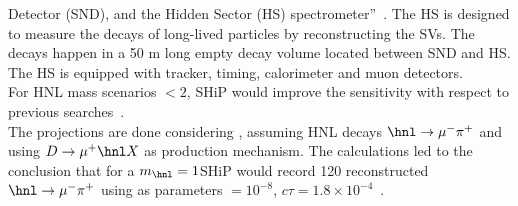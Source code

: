 Detector (SND), and the Hidden Sector (HS)
spectrometer''~\cite{CERN-SHiP-NOTE-2018-001}. The HS is designed to
measure the decays of long-lived particles by reconstructing the
SVs. The decays happen in a 50 m long empty decay volume located
between SND and HS. The HS is equipped with 
tracker, timing, calorimeter and muon detectors. \\
For HNL mass scenarios $<2$\GeV, SHiP would improve the sensitivity
with respect to previous searches~\cite{bonivento2013proposal}.\\
The projections are done considering \mixparm, assuming HNL decays $\hnl
\rightarrow \mu^{-} \pi^{+}$ and using $D
\rightarrow \mu^{+} \hnl X$ as production mechanism. The calculations
led to the conclusion that for a $m_\hnl = 1$\GeV SHiP would record
120 reconstructed $\hnl
\rightarrow \mu^{-} \pi^{+}$ using as parameters \mixparm $= 10^{-8}$,
$c\tau = 1.8 \times 10^{-4}$~\cite{bonivento2013proposal}. \\

